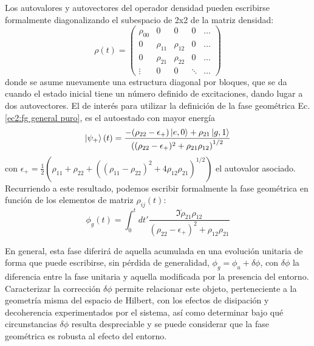 Los autovalores y autovectores del operador densidad pueden escribirse formalmente  diagonalizando el subespacio de 2x2 de la matriz densidad:
\begin{equation}
    \rho(t)=\begin{pmatrix}
        \rho_{00} & 0 & 0 & 0 &\dots \\
        0 & \rho_{11} & \rho_{12} & 0 & \dots \\
        0 & \rho_{21} & \rho_{22} & 0 & \dots \\ 
        \vdots & 0 & 0 & \ddots & \dots 
    \end{pmatrix}
\end{equation}
donde se asume nuevamente una estructura diagonal por bloques, que se da cuando el estado inicial tiene un número definido de excitaciones, dando lugar a dos autovectores. El de interés para utilizar la definición de la fase geométrica Ec. \ref{ec2:fg general puro}, es el autoestado con mayor energía
\begin{equation}
    \ket{\psi_+}(t)=\frac{-(\rho_{22}-\epsilon_+)\ket{e,0}+\rho_{21}\ket{g,1}}{\left((\rho_{22}-\epsilon_+)^2+\rho_{21}\rho_{12} \right)^{1/2}}
\end{equation}
con $\epsilon_+=\frac{1}{2}(\rho_{11}+\rho_{22}+((\rho_{11}-\rho_{22})^2+4\rho_{12}\rho_{21})^{1/2})$ el autovalor asociado. Recurriendo a este resultado, podemos escribir formalmente la fase geométrica en función de los elementos de matriz $\rho_{ij}(t)$:
\begin{equation}
    \phi_g(t)=\int_0^t dt' \frac{\Im \dot\rho_{21}\rho_{12}}{(\rho_{22}-\epsilon_+)^2+\rho_{12}\rho_{21}}
\end{equation}

En general, esta fase diferirá de aquella acumulada en una evolución unitaria de forma que puede
escribirse, sin pérdida de generalidad, $\phi_g=\phi_u+\delta\phi$, con $\delta\phi$ la diferencia entre la fase unitaria y
aquella modificada por la presencia del entorno. Caracterizar la corrección $\delta\phi$ permite relacionar este
objeto, perteneciente a la geometría misma del espacio de Hilbert, con los efectos de disipación y
decoherencia experimentados por el sistema, así como determinar bajo qué circunstancias $\delta\phi$ resulta
despreciable y se puede considerar que la fase geométrica es robusta al efecto del entorno.

